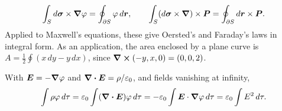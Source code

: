 \begin{fact}
\[
    \int_Sd\boldsymbol{\sigma}\times\grad\varphi = \oint_{\partial S}\varphi\,d\lvect{r},
    \qquad
    \int_S(d\boldsymbol{\sigma}\times\grad)\times\vect{P} = \oint_{\partial S}d\lvect{r}\times\vect{P}.
\]
Applied to Maxwell's equations, these give Oersted's and Faraday's laws in integral form. As an application, the area enclosed by a plane curve is $A = \tfrac12\oint(x\,dy - y\,dx)$, since $\curl(-y,x,0) = (0,0,2)$.
\end{fact}

\begin{example}
With $\vect{E} = -\grad\varphi$ and $\div\vect{E} = \rho/\varepsilon_0$, and fields vanishing at infinity,
\[
    \int\rho\varphi\,d\tau = \varepsilon_0\int(\div\vect{E})\varphi\,d\tau = -\varepsilon_0\int\vect{E}\cdot\grad\varphi\,d\tau = \varepsilon_0\int E^2\,d\tau .
\]
\end{example}
